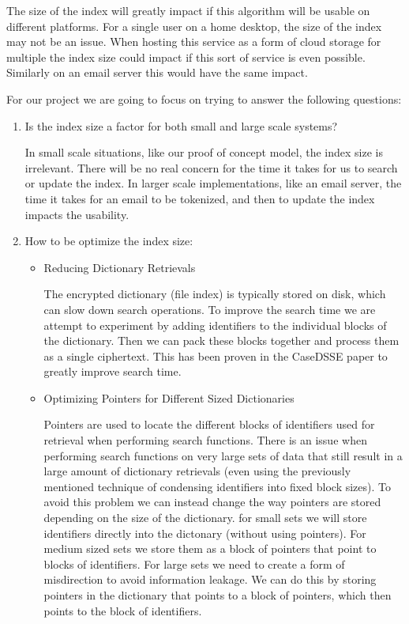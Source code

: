 The size of the index will greatly impact if this algorithm will be usable on different platforms.
For a single user on a home desktop, the size of the index may not be an issue.
When hosting this service as a form of cloud storage for multiple the index size could impact if this sort of service is even possible.
Similarly on an email server this would have the same impact.

For our project we are going to focus on trying to answer the following questions:

\begin{enumerate}
	\item Is the index size a factor for both small and large scale systems? 

In small scale situations, like our proof of concept model, the index size is irrelevant.
There will be no real concern for the time it takes for us to search or update the index.
In larger scale implementations, like an email server, the time it takes for an email to be tokenized, and then to update the index impacts the usability.
    
	\item How to be optimize the index size:
    \begin{itemize}
		\item Reducing Dictionary Retrievals
   
The encrypted dictionary (file index) is typically stored on disk, which can slow down search operations. To improve the search time we are attempt to experiment by adding identifiers to the individual blocks of the dictionary. Then we can pack these blocks together and process them as a single ciphertext. This has been proven in the Case\-DSSE paper to greatly improve search time.  

		\item Optimizing Pointers for Different Sized Dictionaries
        
Pointers are used to locate the different blocks of identifiers used for retrieval when performing search functions. There is an issue when performing search functions on very large sets of data that still result in a large amount of dictionary retrievals (even using the previously mentioned technique of condensing identifiers into fixed block sizes). To avoid this problem we can instead change the way pointers are stored depending on the size of the dictionary. for small sets we will store identifiers directly into the dictonary (without using pointers). For medium sized sets we store them as a block of pointers that point to blocks of identifiers. For large sets we need to create a form of misdirection to avoid information leakage. We can do this by storing pointers in the dictionary that points to a block of pointers, which then points to the block of identifiers.  


\end{itemize}
\end{enumerate}
